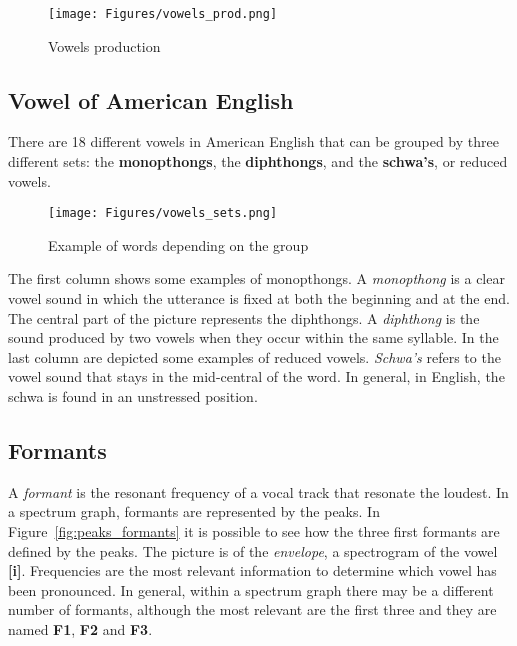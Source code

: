 \begin{figure}[!ht]
    \centering
    \texttt{[image: Figures/vowels\_prod.png]}
    \caption{Vowels production \cite{mit_phonetics}}
    \label{fig:vowels_prod}
\end{figure}

\subsection{Vowel of American English}
\label{sub:vowel_of_american_english}
There are 18 different vowels in American English that can be grouped by three different sets: the \textbf{monopthongs}, the \textbf{diphthongs}, and the \textbf{schwa's}, or reduced vowels.

\begin{figure}[!ht]
    \centering
    \texttt{[image: Figures/vowels\_sets.png]}
    \caption{Example of words depending on the group \cite{mit_phonetics}}
    \label{fig:vowels_sets}
\end{figure}

\noindent The first column shows some examples of monopthongs. A \textit{monopthong} is a clear vowel sound in which the utterance is fixed at both the beginning and at the end. The central part of the picture represents the diphthongs. A \textit{diphthong} is the sound produced by two vowels when they occur within the same syllable. In the last column are depicted some examples of reduced vowels. \textit{Schwa's} refers to the vowel sound that stays in the mid-central of the word. In general, in English, the schwa is found in an unstressed position.


\subsection{Formants}
\label{sub:formants}
A \textit{formant} is the resonant frequency of a vocal track that resonate the loudest. In a spectrum graph, formants are represented by the peaks. In Figure~\ref{fig:peaks_formants} it is possible to see how the three first formants are defined by the peaks. The picture is of the \textit{envelope}, a spectrogram of the vowel \textbf{[i]}. Frequencies are the most relevant information to determine which vowel has been pronounced. In general, within a spectrum graph there may be a different number of formants, although the most relevant are the first three and they are named \textbf{F1}, \textbf{F2} and \textbf{F3}.

